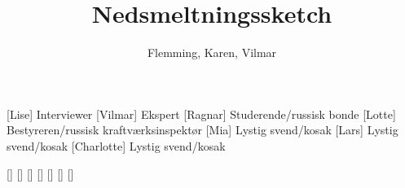 \documentclass[a4paper,11pt]{article}
\title{Nedsmeltningssketch}
\author{Flemming, Karen, Vilmar}
\begin{document}
\maketitle

\begin{roles}
[Lise] Interviewer
[Vilmar] Ekspert
[Ragnar] Studerende/russisk bonde
[Lotte] Bestyreren/russisk kraftværksinspektør
[Mia] Lystig svend/kosak
[Lars] Lystig svend/kosak
[Charlotte] Lystig svend/kosak
\end{roles}

\begin{props}
[]
[]
[]
[]
[]
[]
[]
\end{props}
\end{document}

